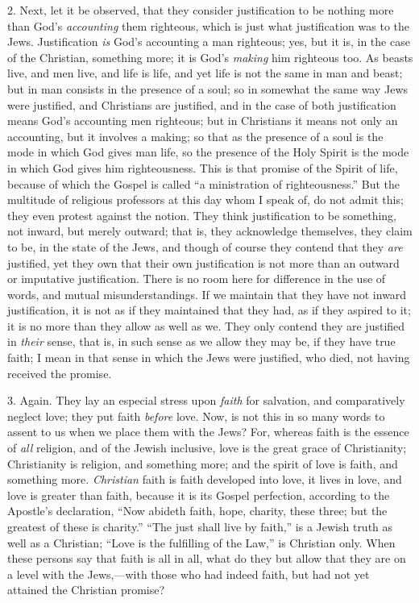 2. Next, let it be observed, that they consider justification to be
nothing more than God's \emph{accounting} them righteous, which is just what
justification was to the Jews. Justification \emph{is} God's accounting
a man righteous; yes, but it is, in the case of the Christian,
something more; it is God's \emph{making} him righteous too. As beasts
live, and men live, and life is life, and yet life is not the same in
man and beast; but in man consists in the presence of a soul; so in
somewhat the same way Jews were justified, and Christians are
justified, and in the case of both justification means God's
accounting men righteous; but in Christians it means not only an
accounting, but it involves a making; so that as the presence of a
soul is the mode in which God gives man life, so the presence of the
Holy Spirit is the mode in which God gives him righteousness. This is
that promise of the Spirit of life, because of which the Gospel is
called ``a ministration of righteousness.'' But the multitude
of religious professors at this day whom I speak of, do not admit
this; they even protest against the notion. They think justification
to be something, not inward, but merely outward; that is, they
acknowledge themselves, they claim to be, in the state of the Jews,
and though of course they contend that they \emph{are} justified, yet
they own that their own justification is not more than an outward or
imputative justification. There is no room here for difference in the
use of words, and mutual misunderstandings. If we maintain that they
have not inward justification, it is not as if they maintained that
they had, as if they aspired to it; it is no more than they allow as
well as we. They only contend they are justified in \emph{their}
sense, that is, in such sense as we allow they may be, if they have
true faith; I mean in that sense in which the Jews were justified, who
died, not having received the promise.

3. Again. They lay an especial stress upon \emph{faith} for
salvation, and comparatively neglect love; they put faith \emph{before}
love. Now, is not this in so many words to assent to us when we place
them with the Jews? For, whereas faith is the essence of \emph{all}
religion, and of the Jewish inclusive, love is the great grace of
Christianity; Christianity is religion, and something more; and the
spirit of love is faith, and something more. \emph{Christian} faith is
faith developed into love, it lives in love, and love is greater than
faith, because it is its Gospel perfection, according to the Apostle's
declaration, ``Now abideth faith, hope, charity, these three; but
the greatest of these is charity.'' ``The just shall live by
faith,'' is a Jewish truth as well as a Christian; ``Love is
the fulfilling of the Law,'' is Christian only. When these persons
say that faith is all in all, what do they but allow that they are on
a level with the Jews,—with those who had indeed faith, but had not
yet attained the Christian promise?

